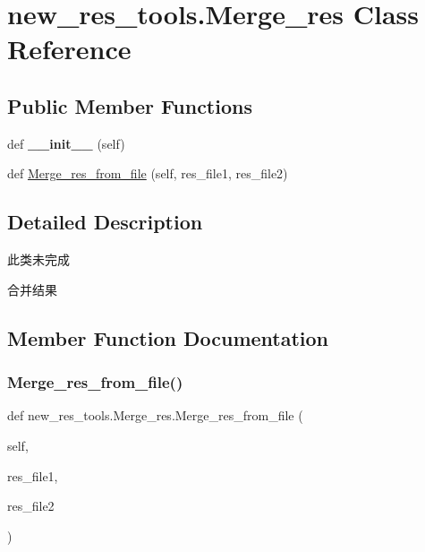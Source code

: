 \hypertarget{classnew__res__tools_1_1Merge__res}{}\section{new\+\_\+res\+\_\+tools.\+Merge\+\_\+res Class Reference}
\label{classnew__res__tools_1_1Merge__res}
\subsection*{Public Member Functions}
\begin{DoxyCompactItemize}
\item 
\mbox{\label{classnew__res__tools_1_1Merge__res_aca1c5d08e5e8cd8ddbbba0dd0730cd28}} 
def {\bfseries \+\_\+\+\_\+init\+\_\+\+\_\+} (self)
\item 
def \hyperlink{classnew__res__tools_1_1Merge__res_a0db686596d9b7d546018c324f70feacf}{Merge\+\_\+res\+\_\+from\+\_\+file} (self, res\+\_\+file1, res\+\_\+file2)
\end{DoxyCompactItemize}


\subsection{Detailed Description}
\begin{DoxyVerb}此类未完成

合并结果\end{DoxyVerb}
 

\subsection{Member Function Documentation}
\mbox{\label{classnew__res__tools_1_1Merge__res_a0db686596d9b7d546018c324f70feacf}} 
\subsubsection{\texorpdfstring{Merge\+\_\+res\+\_\+from\+\_\+file()}{Merge\_res\_from\_file()}}
{\footnotesize\ttfamily def new\+\_\+res\+\_\+tools.\+Merge\+\_\+res.\+Merge\+\_\+res\+\_\+from\+\_\+file (\begin{DoxyParamCaption}\item[{}]{self,  }\item[{}]{res\+\_\+file1,  }\item[{}]{res\+\_\+file2 }\end{DoxyParamCaption})}

